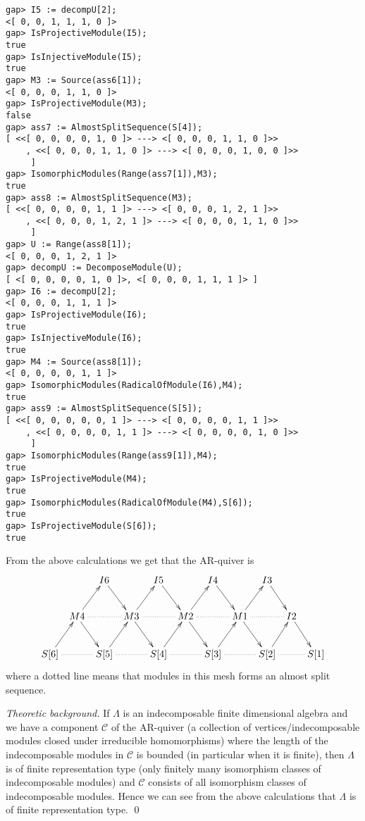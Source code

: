 \documentclass{amsart}
\theoremstyle{definition}
\theoremstyle{theoretic}
\newenvironment{theoback}
{\medskip\small\textit{Theoretic background.} }
{\qed\par\medskip}
\begin{document}
\begin{verbatim}
gap> I5 := decompU[2];
<[ 0, 0, 1, 1, 1, 0 ]>
gap> IsProjectiveModule(I5);               
true
gap> IsInjectiveModule(I5);                
true
gap> M3 := Source(ass6[1]);
<[ 0, 0, 0, 1, 1, 0 ]>
gap> IsProjectiveModule(M3);
false
gap> ass7 := AlmostSplitSequence(S[4]);    
[ <<[ 0, 0, 0, 0, 1, 0 ]> ---> <[ 0, 0, 0, 1, 1, 0 ]>>
    , <<[ 0, 0, 0, 1, 1, 0 ]> ---> <[ 0, 0, 0, 1, 0, 0 ]>>
     ]
gap> IsomorphicModules(Range(ass7[1]),M3);
true
gap> ass8 := AlmostSplitSequence(M3);     
[ <<[ 0, 0, 0, 0, 1, 1 ]> ---> <[ 0, 0, 0, 1, 2, 1 ]>>
    , <<[ 0, 0, 0, 1, 2, 1 ]> ---> <[ 0, 0, 0, 1, 1, 0 ]>>
     ]
gap> U := Range(ass8[1]);                 
<[ 0, 0, 0, 1, 2, 1 ]>
gap> decompU := DecomposeModule(U);       
[ <[ 0, 0, 0, 0, 1, 0 ]>, <[ 0, 0, 0, 1, 1, 1 ]> ]
gap> I6 := decompU[2];
<[ 0, 0, 0, 1, 1, 1 ]>
gap> IsProjectiveModule(I6);
true
gap> IsInjectiveModule(I6);
true
gap> M4 := Source(ass8[1]);
<[ 0, 0, 0, 0, 1, 1 ]>
gap> IsomorphicModules(RadicalOfModule(I6),M4);
true
gap> ass9 := AlmostSplitSequence(S[5]);
[ <<[ 0, 0, 0, 0, 0, 1 ]> ---> <[ 0, 0, 0, 0, 1, 1 ]>>
    , <<[ 0, 0, 0, 0, 1, 1 ]> ---> <[ 0, 0, 0, 0, 1, 0 ]>>
     ]
gap> IsomorphicModules(Range(ass9[1]),M4);
true
gap> IsProjectiveModule(M4);
true
gap> IsomorphicModules(RadicalOfModule(M4),S[6]);
true
gap> IsProjectiveModule(S[6]);
true
\end{verbatim}
From the above calculations we get that the AR-quiver is 
\[\xymatrix@C=5pt{
& & I6\ar[dr] &&  I5\ar[dr] &&  I4\ar[dr] &&  I3\ar[dr] &&  \\
& M4\ar[ur]\ar[dr]\ar@{..}[rr] && M3\ar[ur]\ar[dr]\ar@{..}[rr] &&
M2\ar[ur]\ar[dr]\ar@{..}[rr] && M1\ar[ur]\ar[dr]\ar@{..}[rr] && I2\ar[dr] & \\ 
S[6] \ar[ur]\ar@{..}[rr] && S[5] \ar[ur]\ar@{..}[rr] && S[4]
\ar[ur]\ar@{..}[rr] && S[3] \ar[ur]\ar@{..}[rr] && S[2]
\ar[ur]\ar@{..}[rr] && S[1] 
}\]
where a dotted line means that modules in this mesh forms an almost
split sequence. 

\begin{theoback}
  If $\Lambda$ is an indecomposable finite dimensional algebra and we
  have a component $\mathcal{C}$ of the AR-quiver (a collection of
  vertices/indecomposable modules closed under irreducible
  homomorphisms) where the length of the indecomposable modules in
  $\mathcal{C}$ is bounded (in particular when it is finite), then
  $\Lambda$ is of finite representation type (only finitely many
  isomorphism classes of indecomposable modules) and $\mathcal{C}$
  consists of all isomorphism classes of indecomposable modules.
  Hence we can see from the above calculations that $\Lambda$ is of
  finite representation type. 
\end{theoback}
\end{document}
